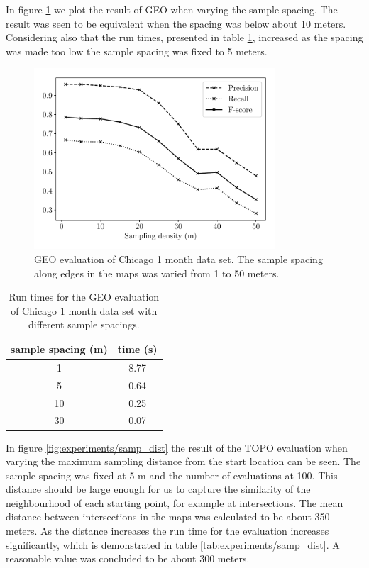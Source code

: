 In figure \ref{fig:experiments/marker_dens} we plot the result of GEO when varying the sample spacing. The result was seen to be equivalent when the spacing was below about 10 meters. Considering also that the run times, presented in table \ref{tab:experiments/marker_dens}, increased as the spacing was made too low the sample spacing was fixed to 5 meters.
\begin{figure}[H]
    \centering
    \includegraphics[width=9cm]{Figures/Experimental_Setup/test_marker_density.pdf}
    \caption{GEO evaluation of Chicago 1 month data set. The sample spacing along edges in the maps was varied from 1 to 50 meters.}
    \label{fig:experiments/marker_dens}
\end{figure}

\begin{table}[H]
\centering
\caption{Run times for the GEO evaluation of Chicago 1 month data set with different sample spacings.}
\label{tab:experiments/marker_dens}
\begin{tabular}{cc}
sample spacing (m) & time (s) \\ \hline
1 & 8.77 \\
5 & 0.64 \\
10 & 0.25 \\ 
30 & 0.07 \\
\hline
\end{tabular}
\end{table}

In figure \ref{fig:experiments/samp_dist} the result of the TOPO evaluation when varying the maximum sampling distance from the start location can be seen. The sample spacing was fixed at 5 m and the number of evaluations at 100. This distance should be large enough for us to capture the similarity of the neighbourhood of each starting point, for example at intersections. The mean distance between intersections in the maps was calculated to be about 350 meters. As the distance increases the run time for the evaluation increases significantly, which is demonstrated in table \ref{tab:experiments/samp_dist}. A reasonable value was concluded to be about 300 meters.

